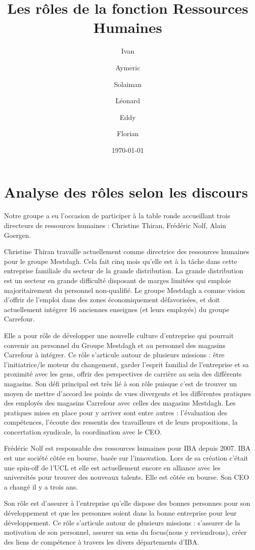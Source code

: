 \documentclass[a4paper, 12pt]{article}
\author{Ivan \bsc{Ahad} \and Aymeric \bsc{De Cocq} \and Solaiman \bsc{El Jilali} \and Léonard \bsc{Julémont} \and Eddy \bsc{Ndizera} \and Florian \bsc{Thuin}}
\title{Les rôles de la fonction Ressources Humaines}
\date{\today}
\begin{document}
\maketitle


\section{Analyse des rôles selon les discours}
Notre groupe a eu l'occasion de participer à la table ronde accueillant trois directeurs de ressources humaines : Christine Thiran, Frédéric Nolf, Alain Goergen.

Christine Thiran travaille actuellement comme directrice des ressources humaines pour le groupe Mestdagh. Cela fait cinq mois qu'elle est à la tâche dans cette entreprise familiale du secteur de la grande distribution. La grande distribution est un secteur en grande difficulté disposant de marges limitées qui emploie majoritairement du personnel non-qualifié. Le groupe Mestdagh a comme vision d'offrir de l'emploi dans des zones économiquement défavorisées, et doit actuellement intégrer 16 anciennes enseignes (et leurs employés) du groupe Carrefour.

Elle a pour rôle de développer une nouvelle culture d'entreprise qui pourrait convenir au personnel du Groupe Mestdagh et au personnel des magasins Carrefour à intégrer. Ce rôle s'articule autour de plusieurs missions : être l'initiatrice/le moteur du changement, garder l'esprit familial de l'entreprise et sa proximité avec les gens, offrir des perspectives de carrière au sein des différents magasins. Son défi principal est très lié à son rôle puisque c'est de trouver un moyen de mettre d'accord les points de vues divergents et les différentes pratiques des employés des magasins Carrefour avec celles des magasins Mestdagh. Les pratiques mises en place pour y arriver sont entre autres : l'évaluation des compétences, l'écoute des ressentis des travailleurs et de leurs propositions, la concertation syndicale, la coordination avec le CEO.

Frédéric Nolf est responsable des ressources humaines pour IBA depuis 2007. IBA est une société côtée en bourse, basée sur l'innovation. Lors de sa création c'était une spin-off de l'UCL et elle est actuellement encore en alliance avec les universités pour trouver des nouveaux talents. Elle est côtée en bourse. Son CEO a changé il y a trois ans.

Son rôle est d'assurer à l'entreprise qu'elle dispose des bonnes personnes pour son développement et que les personnes soient dans la bonne entreprise pour leur développement. Ce rôle s'articule autour de plusieurs missions : s'assurer de la motivation de son personnel, assurer un \og{} sens du focus\fg{}(nous y reviendrons), créer des liens de compétence à travers les divers départements d'IBA.
\end{document}
